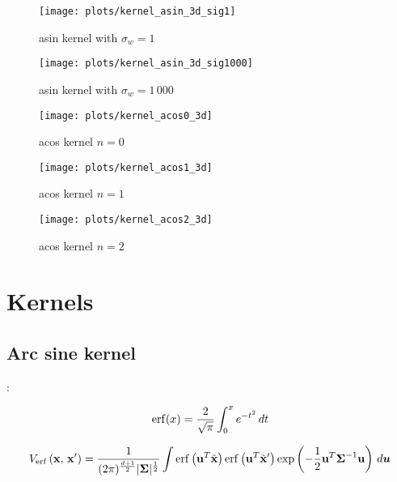 \begin{figure}
    \texttt{[image: plots/kernel\_asin\_3d\_sig1]}
    \caption{asin kernel with $\sigma_w=1$}
\end{figure}

\begin{figure}
    \texttt{[image: plots/kernel\_asin\_3d\_sig1000]}
    \caption{asin kernel with $\sigma_w=1\,000$}
\end{figure}


\begin{figure}
    \texttt{[image: plots/kernel\_acos0\_3d]}
    \caption{acos kernel $n=0$}
    \label{fig:kernel_acos0_3d}
\end{figure}

\begin{figure}
    \texttt{[image: plots/kernel\_acos1\_3d]}
    \caption{acos kernel $n=1$}
\end{figure}

\begin{figure}
    \texttt{[image: plots/kernel\_acos2\_3d]}
    \caption{acos kernel $n=2$}
\end{figure}

\section{Kernels}
\subsection{Arc sine kernel}

\textcite{frenayParameterinsensitiveKernelExtreme2011,williamsComputationInfiniteNeural1998}:


\begin{equation}
    \operatorname{erf}(x) = \frac{2}{\sqrt{\pi}} \int_0^x e^{-t^2} \,dt
\end{equation}


\begin{equation}
    V_{\operatorname{erf}}\left(\mathbf{x},\,\mathbf{x}'\right) =
    \frac{1}{(2\pi)^{\frac{d+1}{2}} |\boldsymbol \Sigma|^{\frac{1}{2}}}
    \int
    \operatorname{erf} \left(\mathbf{u} ^T \tilde {\mathbf{x}} \right)
    \operatorname{erf} \left(\mathbf{u} ^T \tilde {\mathbf{x}} '\right)
    \exp \left(
    -\frac{1}{2} \mathbf{u} ^T \boldsymbol \Sigma^{-1} \mathbf{u}
    \right)
    \,d\boldsymbol u
\end{equation}

